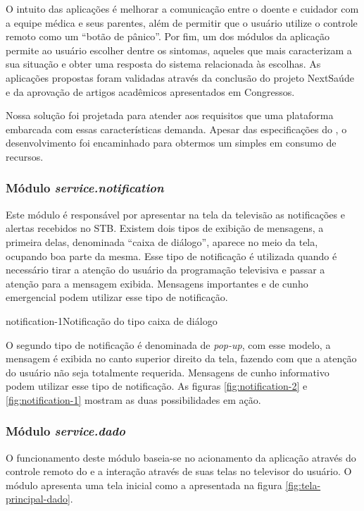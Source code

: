 O intuito das aplicações é melhorar a comunicação entre o doente e cuidador com
a equipe médica e seus parentes, além de permitir que o usuário utilize o
controle remoto como um ``botão de pânico''. Por fim, um dos módulos da
aplicação permite ao usuário escolher dentre os sintomas, aqueles que mais
caracterizam a sua situação e obter uma resposta do sistema relacionada às
escolhas. As aplicações  propostas foram validadas através da conclusão do
projeto NextSaúde e da aprovação de artigos acadêmicos apresentados em
Congressos.

Nossa solução foi projetada para atender aos requisitos que uma plataforma
embarcada com essas características demanda. Apesar das especificações do
\hardware[], o desenvolvimento foi encaminhado para obtermos um \software[]
simples em consumo de recursos.

\subsubsection{Módulo \textit{service.notification}}\label{subsubsec:notification}

Este módulo é responsável por apresentar na tela da televisão as notificações e
alertas recebidos no STB. Existem dois tipos de exibição de mensagens, a
primeira delas, denominada ``caixa de diálogo'', aparece no meio da tela,
ocupando boa parte da mesma. Esse tipo de notificação é utilizada quando é
necessário tirar a atenção do usuário da programação televisiva e passar a
atenção para a mensagem exibida. Mensagens importantes e de cunho emergencial
podem utilizar esse tipo de notificação.   

{notification-1}{Notificação do tipo caixa de diálogo}

O segundo tipo de notificação é denominada de \textit{pop-up}, com esse modelo,
a mensagem é exibida no canto superior direito da tela, fazendo com que a
atenção do usuário não seja totalmente requerida. Mensagens de cunho informativo
podem utilizar esse tipo de notificação. As figuras \ref{fig:notification-2} e
\ref{fig:notification-1}  mostram as duas possibilidades em ação.

\subsubsection{Módulo \textit{service.dado}}\label{subsubsec:dado}

O funcionamento deste módulo baseia-se no acionamento da aplicação através
do controle remoto do \stb[] e a interação através de suas telas no televisor
do usuário. O módulo apresenta uma tela inicial como a apresentada na 
figura \ref{fig:tela-principal-dado}.

